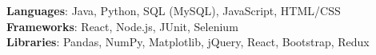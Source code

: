 
 \begin{itemize}[leftmargin=0.15in, label={}]
    \small{\item{
     \textbf{Languages}{: Java, Python, SQL (MySQL), JavaScript, HTML/CSS} \\
     \textbf{Frameworks}{: React, Node.js, JUnit, Selenium} \\
     \textbf{Libraries}{: Pandas, NumPy, Matplotlib, jQuery, React, Bootstrap, Redux}
    }}
 \end{itemize}